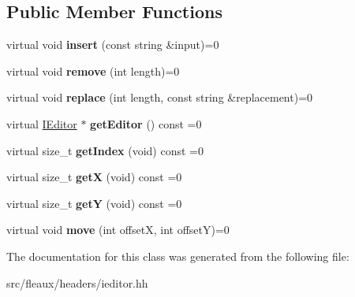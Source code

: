 \subsection*{Public Member Functions}
\begin{DoxyCompactItemize}
\item 
\hypertarget{classFleaux_1_1ICursor_a1293fc286aa66c2cfe1ba01096692073}{}virtual void {\bfseries insert} (const string \&input)=0\label{classFleaux_1_1ICursor_a1293fc286aa66c2cfe1ba01096692073}

\item 
\hypertarget{classFleaux_1_1ICursor_a0b236476cce265d4daf66a4dffc413b4}{}virtual void {\bfseries remove} (int length)=0\label{classFleaux_1_1ICursor_a0b236476cce265d4daf66a4dffc413b4}

\item 
\hypertarget{classFleaux_1_1ICursor_a0d6b32530ce9e5cdafd0d8e7e003b80f}{}virtual void {\bfseries replace} (int length, const string \&replacement)=0\label{classFleaux_1_1ICursor_a0d6b32530ce9e5cdafd0d8e7e003b80f}

\item 
\hypertarget{classFleaux_1_1ICursor_ac0a33cf2cfd5a47abfe818f83b517225}{}virtual \hyperlink{classFleaux_1_1IEditor}{I\+Editor} $\ast$ {\bfseries get\+Editor} () const =0\label{classFleaux_1_1ICursor_ac0a33cf2cfd5a47abfe818f83b517225}

\item 
\hypertarget{classFleaux_1_1ICursor_a53f938f5ff2c162964bd5e4a59783702}{}virtual size\+\_\+t {\bfseries get\+Index} (void) const =0\label{classFleaux_1_1ICursor_a53f938f5ff2c162964bd5e4a59783702}

\item 
\hypertarget{classFleaux_1_1ICursor_a3e98e81768c9ffe9c5f423d55ece0721}{}virtual size\+\_\+t {\bfseries get\+X} (void) const =0\label{classFleaux_1_1ICursor_a3e98e81768c9ffe9c5f423d55ece0721}

\item 
\hypertarget{classFleaux_1_1ICursor_a84d5f1d13d56c66b1ababe8131bbe219}{}virtual size\+\_\+t {\bfseries get\+Y} (void) const =0\label{classFleaux_1_1ICursor_a84d5f1d13d56c66b1ababe8131bbe219}

\item 
\hypertarget{classFleaux_1_1ICursor_a77702f090f961857f53a06d9fb2f73b2}{}virtual void {\bfseries move} (int offset\+X, int offset\+Y)=0\label{classFleaux_1_1ICursor_a77702f090f961857f53a06d9fb2f73b2}

\end{DoxyCompactItemize}


The documentation for this class was generated from the following file\+:\begin{DoxyCompactItemize}
\item 
src/fleaux/headers/ieditor.\+hh\end{DoxyCompactItemize}
